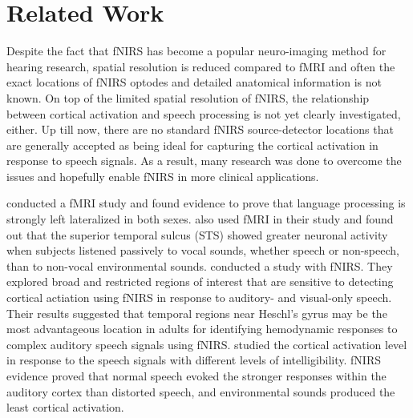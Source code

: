 \section{Related Work}


Despite the fact that fNIRS has become a popular neuro-imaging method for hearing research, spatial resolution is reduced compared to fMRI and often the exact locations of fNIRS optodes and detailed anatomical information is not known. On top of the limited spatial resolution of fNIRS, the relationship between cortical activation and speech processing is not yet clearly investigated, either. Up till now,  there are no standard fNIRS source-detector locations that are generally accepted as being ideal for capturing the cortical activation in response to speech signals. As a result, many research was done to overcome the issues and hopefully enable fNIRS in more clinical applications.

\cite {Frost1999-vs} conducted a fMRI study and found evidence to prove that language processing is strongly left lateralized in both sexes. \cite {Belin2000} also used fMRI in their study and found out that the superior temporal sulcus (STS) showed greater neuronal activity when subjects listened passively to vocal sounds, whether speech or non-speech, than to non-vocal environmental sounds. \cite {Shader2021} conducted a study with fNIRS. They explored broad and restricted regions of interest that are sensitive to detecting cortical actiation using fNIRS in response to auditory- and visual-only speech. Their results suggested that temporal regions near  Heschl's gyrus may be the most advantageous location in adults for identifying hemodynamic responses to complex auditory speech signals using fNIRS. \cite{Pollonini2013} studied the cortical activation level in response to the speech signals with different levels of intelligibility. fNIRS evidence proved that normal speech evoked the stronger responses within the auditory cortex than distorted speech, and environmental sounds produced the least cortical activation.




